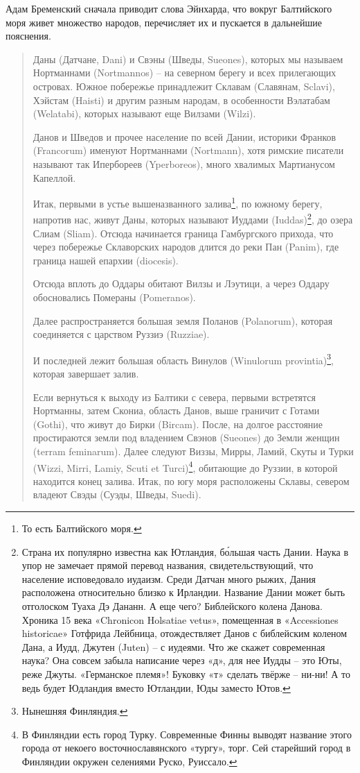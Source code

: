 Адам Бременский сначала приводит слова Эйнхарда, что вокруг Балтийского моря живет множество народов, перечисляет их и пускается в дальнейшие пояснения.

\begin{quotation}
Даны (Датчане, Dani) и Свэны (Шведы, Sueo\-nes), которых мы называем Нортманнами (Nort\-man\-nos) – на северном берегу и всех прилегающих островах. Южное побережье принадлежит Склавам (Славянам, Sclavi), Хэйстам (Haisti) и другим разным народам, в особенности Вэлатабам (Welatabi), которых называют еще Вилзами (Wilzi).

Данов и Шведов и прочее население по всей Дании, историки Франков (Francorum) именуют Нортманнами (Nortmann), хотя римские писатели называют так Ипербореев (Yperboreos), много хвалимых Мартианусом Капеллой.

Итак, первыми в устье вышеназванного залива\footnote{То есть Балтийского моря.}, по южному берегу, напротив нас, живут Даны, которых называют Иуддами (Iuddas)\footnote{Страна их популярно известна как Ютландия, б\'ольшая часть Дании. Наука в упор не замечает прямой перевод названия, свидетельствующий, что население исповедовало иудаизм. Среди Датчан много рыжих, Дания расположена относительно близко к Ирландии. Название Дании может быть отголоском Туаха Дэ Дананн. А еще чего? Библейского колена Данова. Хроника 15 века «Chronicon Holsatiae vetus», помещенная в «Accessiones historicae» Готфрида Лейбница\cite{leibn}, отождествляет Данов с библейским коленом Дана, а Иудд, Джутен (Juten) – с иудеями. Что же скажет современная наука? Она совсем забыла написание через «д», для нее Иудды – это Юты, реже Джуты. «Германское племя»! Буковку «т» сделать твёрже – ни-ни! А то ведь будет Юдландия вместо Ютландии, Юды заместо Ютов.}, до озера Слиам (Sliam). Отсюда начинается граница Гамбургского прихода, что через побережье Склаворских народов длится до реки Пан (Panim), где граница нашей епархии (diocesis).

Отсюда вплоть до Оддары обитают Вилзы и Лэутици, а через Оддару обосновались Помераны (Pomera\-nos). 

Далее распространяется большая земля Поланов (Polanorum), которая соединяется с царством Руззиэ (Ruzziae).

И последней лежит большая область Винулов (Wi\-nulorum provintia)\footnote{Нынешняя Финляндия.}, которая завершает залив. 

Если вернуться к выходу из Балтики с севера, первыми встретятся Нортманны, затем Скониа, область Данов, выше граничит с Готами (Gothi), что живут до Бирки (Bircam). После, на долгое расстояние простираются земли под владением Свэнов (Sueones) до Земли женщин (terram feminarum). Далее следуют Виззы, Мирры, Ламий, Скуты и Турки (Wizzi, Mirri, Lamiy, Scuti et Turci)\footnote{В Финляндии есть город Турку. Современные Финны выводят название этого города от некоего восточнославянского «тургу», торг. Сей старейший город в Финляндии окружен селениями Руско, Руиссало.}, обитающие до Руззии, в которой находится конец залива. Итак, по югу моря расположены Склавы, севером владеют Свэды (Суэды, Шведы, Suedi).


\end{quotation}

